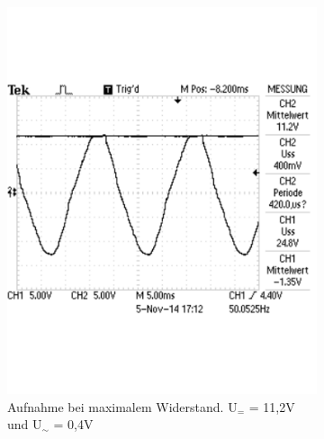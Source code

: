 \documentclass[12pt,a4paper]{article}
\begin{document}
\begin{figure}[H]
        \centering
        \begin{subfigure}[b]{0.48\textwidth}
                \includegraphics[width=\textwidth , scale = 0.4]{2_5_1000F_1.pdf}
                \caption[Aufnahme bei maximalem Widerstand. U$_{=}$ = 11,2V und U$_\sim$ = 0,4V]{Aufnahme bei maximalem Widerstand. U$_{=}$ = 11,2V und U$_\sim$ = 0,4V}
 				 \label{fig:2_5_1000F_1}
        \end{subfigure}%
        \hfill
        \begin{subfigure}[b]{0.48\textwidth}

\end{subfigure}
\end{figure}
\end{document}
